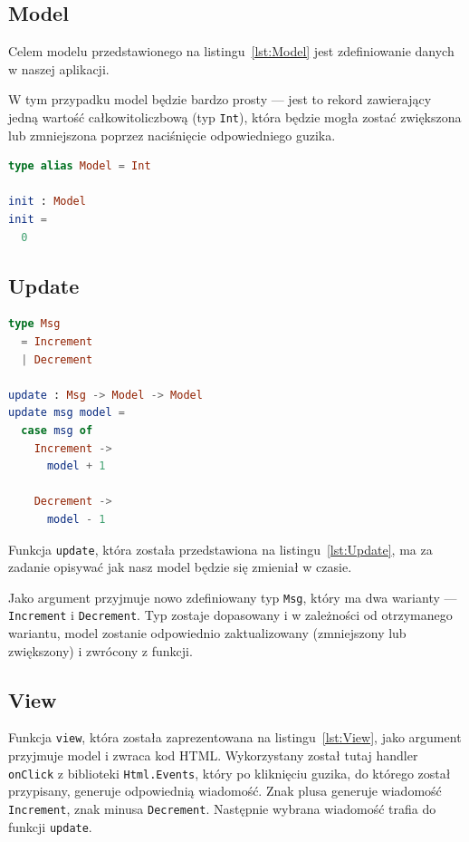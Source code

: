 \documentclass[twoside,a4paper]{report}
\begin{document}
\subsection{Model}
\begin{minipage}{.50\textwidth}
    Celem modelu przedstawionego na listingu~\ref{lst:Model} jest zdefiniowanie danych w naszej aplikacji.

    W tym przypadku model będzie bardzo prosty --- jest to rekord zawierający jedną wartość całkowitoliczbową (typ \texttt{Int}), która będzie mogła zostać zwiększona lub zmniejszona poprzez naciśnięcie odpowiedniego guzika.
\end{minipage}\hfill
\begin{minipage}{.43\textwidth}
\begin{lstlisting}[caption={\textit{The Elm Architecture} --- Model},label={lst:Model},language={Elm}]
type alias Model = Int

init : Model
init =
  0
    \end{lstlisting}
\end{minipage}\hfill

\subsection{Update}
\begin{minipage}{.43\textwidth}
    \begin{lstlisting}[caption={\textit{The Elm Architecture} --- Update},label={lst:Update},language={Elm}]
type Msg
  = Increment
  | Decrement

update : Msg -> Model -> Model
update msg model =
  case msg of
    Increment ->
      model + 1

    Decrement ->
      model - 1
    \end{lstlisting}
\end{minipage}\hfill
\begin{minipage}{.50\textwidth}
    Funkcja \texttt{update}, która została przedstawiona na listingu~\ref{lst:Update}, ma za zadanie opisywać jak nasz model będzie się zmieniał w czasie.

    Jako argument przyjmuje nowo zdefiniowany typ \texttt{Msg}, który ma dwa warianty --- \texttt{Increment} i \texttt{Decrement}. Typ zostaje dopasowany i w zależności od otrzymanego wariantu, model zostanie odpowiednio zaktualizowany (zmniejszony lub zwiększony) i zwrócony z funkcji.
\end{minipage}\hfill

\subsection{View}
Funkcja \texttt{view}, która została zaprezentowana na listingu~\ref{lst:View}, jako argument przyjmuje model i zwraca kod HTML\@.
Wykorzystany został tutaj handler \texttt{onClick} z biblioteki \texttt{Html.Events}, który po kliknięciu guzika, do którego został przypisany, generuje odpowiednią wiadomość.
Znak plusa generuje wiadomość \texttt{Increment}, znak minusa \texttt{Decrement}.
Następnie wybrana wiadomość trafia do funkcji \texttt{update}.
\end{document}
